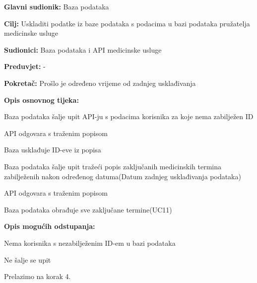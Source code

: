 					\noindent {}
					\begin{packed_item}
						
						\item \textbf{Glavni sudionik:} Baza podataka
						\item  \textbf{Cilj:} Uskladiti podatke iz baze podataka s podacima u bazi podataka pružatelja medicinske usluge
						\item  \textbf{Sudionici:} Baza podataka i API medicinske usluge
						\item  \textbf{Preduvjet:} -
						\item  \textbf{Pokretač:} Prošlo je određeno vrijeme od zadnjeg usklađivanja
						\item  \textbf{Opis osnovnog tijeka:}
						
						\item[] \begin{packed_enum}
							
							\item Baza podataka šalje upit API-ju s podacima korisnika za koje nema zabilježen ID
							\item API odgovara s traženim popisom
							\item Baza usklađuje ID-eve iz popisa
							\item Baza podataka šalje upit tražeći popis zaključanih medicinskih termina zabilježenih nakon određenog datuma(Datum zadnjeg usklađivanja podataka)
							\item API odgovara s traženim popisom
							\item Baza podataka obrađuje sve zaključane termine(UC11)
							
						\end{packed_enum}
						
						\item  \textbf{Opis mogućih odstupanja:}
						
						\item[] \begin{packed_item}
							
							\item[1.a] Nema korisnika s nezabilježenim ID-em u bazi podataka
							\item[] \begin{packed_enum}
								
								\item Ne šalje se upit
								\item Prelazimo na korak 4.
								

\end{packed_enum}
\end{packed_item}
\end{packed_item}
